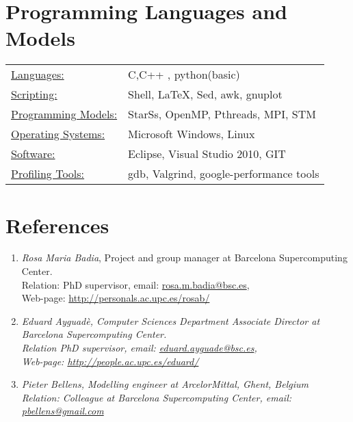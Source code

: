 \documentclass[margin]{res}
\begin{document}
\begin{resume}
	\section{Programming Languages and Models}
	   \begin{tabular}{l p{3in}}
		\underline{Languages:} & C\smallskip ,C++ \smallskip, python(basic)\smallskip \\
		\underline{Scripting:} & Shell\smallskip, LaTeX\smallskip , Sed\smallskip, awk\smallskip, gnuplot\\
		\underline{Programming Models:} & StarSs\smallskip, OpenMP\smallskip, Pthreads\smallskip, MPI\smallskip, STM\\
		\underline{Operating Systems:}  & Microsoft Windows\smallskip , Linux\\
	    \underline{Software:} & Eclipse, Visual Studio 2010\smallskip, GIT\smallskip\\
	    \underline{Profiling Tools:} &gdb, Valgrind\smallskip, google-performance tools\smallskip \\ 
	 \end{tabular}
%
% 
	\section{References}
	\begin{enumerate}
		   \item {\it Rosa Maria Badia}, Project and group manager at Barcelona Supercomputing Center.\\ 
				 Relation: PhD supervisor, email: \href{}{rosa.m.badia@bsc.es},\\
				 Web-page: \url{http://personals.ac.upc.es/rosab/}
		   \item \it {Eduard Ayguadè}, Computer Sciences Department Associate Director at Barcelona Supercomputing Center.\\ 
				 Relation PhD supervisor, email: \href{}{eduard.ayguade@bsc.es},\\
				 Web-page: \url{http://people.ac.upc.es/eduard/}
		   \item \it {Pieter Bellens}, Modelling engineer at ArcelorMittal, Ghent, Belgium\\
				 Relation: Colleague at Barcelona Supercomputing Center, email: \href{}{pbellens@gmail.com}
	
	\end{enumerate}
\end{resume} 
%
\end{document}
